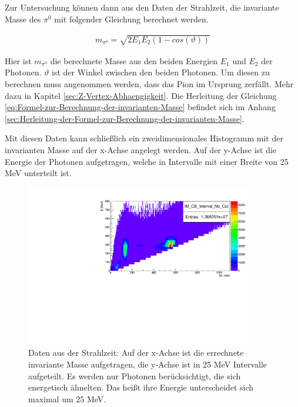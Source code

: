 \documentclass[a4paper,11pt,oneside,final,german,openbib,pdftex]{scrbook}
\begin{document}
{Zur Untersuchung k\"onnen dann aus den Daten der Strahlzeit, die invariante Masse des $\pi^0$ mit folgender Gleichung berechnet werden.

 \begin{equation}
 \begin{split}
 {m_{\pi^0}=\sqrt{2E_1E_2(1-cos(\vartheta))}}
 \label{eq:Formel-zur-Berechnung-der-invarianten-Masse}
 \end{split}
 \end{equation}

Hier ist $m_{\pi^0}$ die berechnete Masse aus den beiden Energien $E_1$ und $E_2$ der Photonen. $\vartheta$ ist der Winkel zwischen den beiden Photonen. Um diesen zu berechnen muss angenommen werden, dass das Pion im Ursprung zerf\"allt. Mehr dazu in Kapitel \ref{sec:Z-Vertex-Abhaengigkeit}.
Die Herleitung der Gleichung \ref{eq:Formel-zur-Berechnung-der-invarianten-Masse} befindet sich im Anhang \ref{sec:Herleitung-der-Formel-zur-Berechnung-der-invarianten-Masse}.

Mit diesen Daten kann schließlich ein zweidimensionales Histogramm mit der invarianten Masse auf der x-Achse angelegt werden. Auf der y-Achse ist die Energie der Photonen aufgetragen, welche in Intervalle mit einer Breite von 25 MeV unterteilt ist. 


\begin{figure}[h!]
	\begin{center}
		\includegraphics[width=100mm]{NewCalib/Strahlzeit2014/20171904Uncharged2DHist}
	
		\caption[Strahlzeit: 2D-Histogramm; Symmetrische Photonen]{Daten aus der Strahlzeit: Auf der x-Achse ist die errechnete invariante Masse aufgetragen, die y-Achse ist in 25 MeV Intervalle aufgeteilt. Es werden nur Photonen ber\"ucksichtigt, die sich energetisch \"ahnelten. Das hei{\ss}t ihre Energie unterscheidet sich maximal um 25 MeV.}
			\label{fig:Energy-Interval-Hist-All-Bins}
	\end{center}
\end{figure}

}
\end{document}
